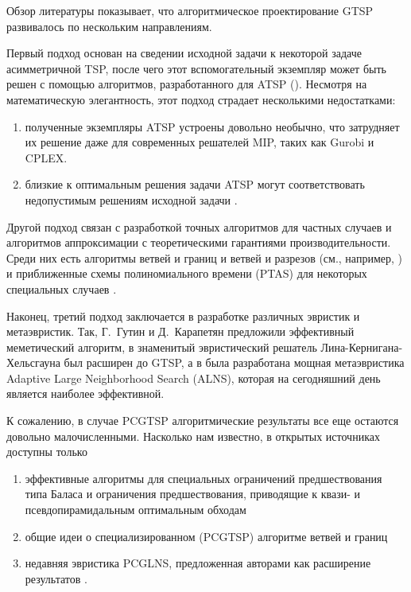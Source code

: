 Обзор литературы показывает, 
что алгоритмическое проектирование GTSP развивалось по нескольким направлениям.

Первый подход основан на сведении исходной задачи к некоторой задаче асимметричной TSP, 
после чего этот вспомогательный экземпляр может быть решен с помощью алгоритмов, 
разработанного для ATSP 
(\cite{LaporteSemet1999, NoonBean1993}). 
Несмотря на математическую элегантность, 
этот подход страдает несколькими недостатками:
\begin{enumerate}
\item
полученные экземпляры ATSP устроены довольно необычно, 
что затрудняет их решение даже для современных решателей MIP, 
таких как Gurobi и CPLEX.
\item
близкие к оптимальным решения задачи ATSP
могут соответствовать недопустимым решениям исходной задачи 
\cite{KaraGut2012}.
\end{enumerate}

Другой подход связан с разработкой точных алгоритмов для частных случаев 
и алгоритмов аппроксимации с теоретическими гарантиями производительности. 
Среди них есть алгоритмы ветвей и границ и ветвей и разрезов 
(см., например, \cite{FishGonToth1997, Yuan2020}) 
и приближенные схемы полиномиального времени (PTAS) 
для некоторых специальных случаев 
\cite{FerGriSit2006, KhN-PSIM2017}.

Наконец, 
третий подход заключается в разработке 
различных эвристик и метаэвристик. 
Так, Г.~Гутин и Д.~Карапетян \cite{Gutin-2010} 
предложили эффективный меметический алгоритм, 
в \cite{Helsgaun-2015} знаменитый эвристический решатель 
Лина-Кернигана-Хельсгауна был расширен до GTSP, 
а в \cite{SMITH20171} была разработана мощная метаэвристика 
Adaptive Large Neighborhood Search (ALNS), 
которая на сегодняшний день является наиболее эффективной.

К сожалению, в случае PCGTSP 
алгоритмические результаты все еще остаются довольно малочисленными. 
Насколько нам известно, в открытых источниках доступны только
\begin{enumerate}
	\item
	эффективные алгоритмы для специальных ограничений предшествования типа Баласа 
	\cite {Balas-Sim2001, ChenKhKh2016, CKK-IFAC2016} 
	и ограничения предшествования, приводящие к квази- и псевдопирамидальным оптимальным обходам	
	\cite{KhN-AMAI-2020}
	\item
	общие идеи о специализированном (PCGTSP) алгоритме ветвей и границ
	\cite{SALMAN2020163}
	\item
	недавняя эвристика PCGLNS, предложенная авторами 
	\cite{KKP-optima2020} 
	как расширение результатов
	\cite{SMITH20171}. 
\end{enumerate} 

